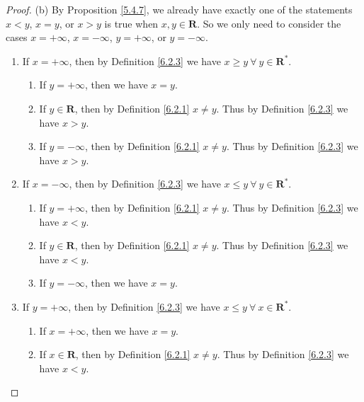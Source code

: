 \begin{proof}{(b)}
    By Proposition \ref{5.4.7}, we already have exactly one of the statements \(x < y\), \(x = y\), or \(x > y\) is true when \(x, y \in \mathbf{R}\).
    So we only need to consider the cases \(x = +\infty\), \(x = -\infty\), \(y = +\infty\), or \(y = -\infty\).
    \begin{enumerate}[label=(\Roman*)]
        \item If \(x = +\infty\), then by Definition \ref{6.2.3} we have \(x \geq y \ \forall\ y \in \mathbf{R}^*\).
              \begin{enumerate}[label=(\roman*)]
                  \item If \(y = +\infty\), then we have \(x = y\).
                  \item If \(y \in \mathbf{R}\), then by Definition \ref{6.2.1} \(x \neq y\).
                        Thus by Definition \ref{6.2.3} we have \(x > y\).
                  \item If \(y = -\infty\), then by Definition \ref{6.2.1} \(x \neq y\).
                        Thus by Definition \ref{6.2.3} we have \(x > y\).
              \end{enumerate}
        \item If \(x = -\infty\), then by Definition \ref{6.2.3} we have \(x \leq y \ \forall\ y \in \mathbf{R}^*\).
              \begin{enumerate}[label=(\roman*)]
                  \item If \(y = +\infty\), then by Definition \ref{6.2.1} \(x \neq y\).
                        Thus by Definition \ref{6.2.3} we have \(x < y\).
                  \item If \(y \in \mathbf{R}\), then by Definition \ref{6.2.1} \(x \neq y\).
                        Thus by Definition \ref{6.2.3} we have \(x < y\).
                  \item If \(y = -\infty\), then we have \(x = y\).
              \end{enumerate}
        \item If \(y = +\infty\), then by Definition \ref{6.2.3} we have \(x \leq y \ \forall\ x \in \mathbf{R}^*\).
              \begin{enumerate}[label=(\roman*)]
                  \item If \(x = +\infty\), then we have \(x = y\).
                  \item If \(x \in \mathbf{R}\), then by Definition \ref{6.2.1} \(x \neq y\).
                        Thus by Definition \ref{6.2.3} we have \(x < y\).

\end{enumerate}
\end{enumerate}
\end{proof}
